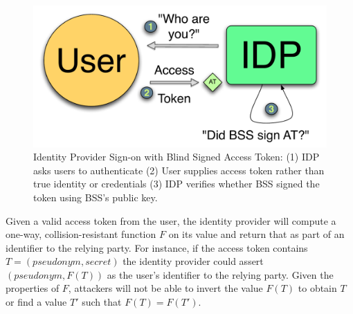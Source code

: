 \documentclass[11pt]{llncs}
\begin{document}
\begin{figure}
  \centering
  \includegraphics[scale=0.6]{figs/fig-bss-signon-color.pdf}
  \caption{Identity Provider Sign-on with Blind Signed Access Token:
    (1) IDP asks users to authenticate (2) User supplies access token
    rather than true identity or credentials (3) IDP verifies whether
    BSS signed the token using BSS's public key.}
  \label{fig:bss-signon}
\end{figure}

Given a valid access token from the user, the identity provider will
compute a one-way, collision-resistant function $F$ on its value and
return that as part of an identifier to the relying party. For
instance, if the access token contains $T = (pseudonym, secret)$ the
identity provider could assert $(pseudonym, F(T))$ as the user's
identifier to the relying party. Given the properties of $F$,
attackers will not be able to invert the value $F(T)$ to obtain $T$ or
find a value $T'$ such that $F(T) = F(T')$.
\end{document}

